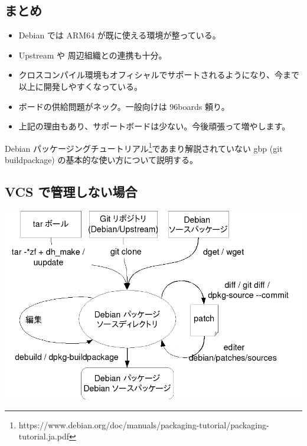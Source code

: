 \documentclass[mingoth,a4paper]{jsarticle}
\begin{document}
  \subsection{まとめ}
  \begin{itemize}
  \item Debian では ARM64 が既に使える環境が整っている。
  \item Upstream や 周辺組織との連携も十分。
  \item クロスコンパイル環境もオフィシャルでサポートされるようになり、今まで以上に開発しやすくなっている。
  \item ボードの供給問題がネック。一般向けは 96boards 頼り。
  \item 上記の理由もあり、サポートボードは少ない。今後頑張って増やします。
  \end{itemize}



Debian パッケージングチュートリアル\footnote{https://www.debian.org/doc/manuals/packaging-tutorial/packaging-tutorial.ja.pdf}であまり解説されていない gbp (git
buildpackage) の基本的な使い方について説明する。

\subsection{VCS で管理しない場合}

\begin{center}
\includegraphics[width=0.8\hsize]{image201509/gbp-images0_mono.png}
\end{center}
\end{document}
